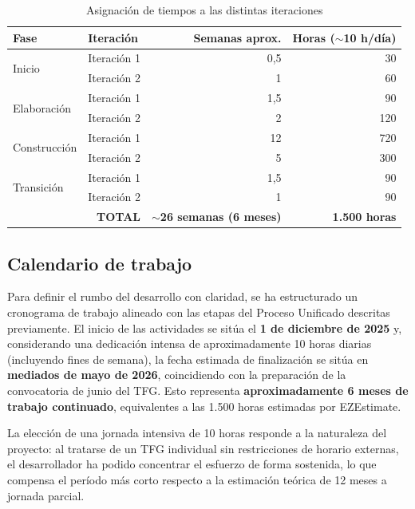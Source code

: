 \documentclass[11pt, a4paper]{article}
\begin{document}
\begin{table}[H]
\centering
\begin{tabular}{|l|l|r|r|}
\hline
\textbf{Fase} & \textbf{Iteración} & \textbf{Semanas aprox.} & \textbf{Horas ($\sim$10 h/día)} \\
\hline
\multirow{2}{*}{Inicio} & Iteración 1 & 0,5 & 30 \\
\cline{2-4}
 & Iteración 2 & 1 & 60 \\
\hline
\multirow{2}{*}{Elaboración} & Iteración 1 & 1,5 & 90 \\
\cline{2-4}
 & Iteración 2 & 2 & 120 \\
\hline
\multirow{2}{*}{Construcción} & Iteración 1 & 12 & 720 \\
\cline{2-4}
 & Iteración 2 & 5 & 300 \\
\hline
\multirow{2}{*}{Transición} & Iteración 1 & 1,5 & 90 \\
\cline{2-4}
 & Iteración 2 & 1 & 90 \\
\hline
\multicolumn{2}{|r|}{\textbf{TOTAL}} & \textbf{$\sim$26 semanas (6 meses)} & \textbf{1.500 horas} \\
\hline
\end{tabular}
\caption{Asignación de tiempos a las distintas iteraciones}\label{tab:tiempos}
\end{table}

\subsection{Calendario de trabajo}

Para definir el rumbo del desarrollo con claridad, se ha estructurado un cronograma de trabajo alineado con las etapas del Proceso Unificado descritas previamente. El inicio de las actividades se sitúa el \textbf{1 de diciembre de 2025} y, considerando una dedicación intensa de aproximadamente 10 horas diarias (incluyendo fines de semana), la fecha estimada de finalización se sitúa en \textbf{mediados de mayo de 2026}, coincidiendo con la preparación de la convocatoria de junio del TFG. Esto representa \textbf{aproximadamente 6 meses de trabajo continuado}, equivalentes a las 1.500 horas estimadas por EZEstimate.

La elección de una jornada intensiva de 10 horas responde a la naturaleza del proyecto: al tratarse de un TFG individual sin restricciones de horario externas, el desarrollador ha podido concentrar el esfuerzo de forma sostenida, lo que compensa el período más corto respecto a la estimación teórica de 12 meses a jornada parcial.
\end{document}
